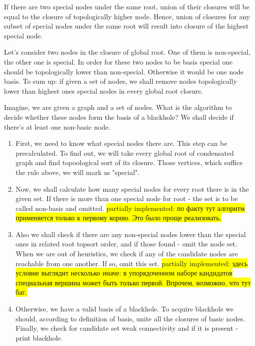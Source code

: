 \documentclass{svproc}
\newcommand{\FIXME}[1]{ %
	\colorbox{yellow}{#1}
}
\newcommand{\FIXME}[1]{ %
}
\begin{document}
If there are two special nodes under the same root, union of their closures will be equal to the closure of topologically higher node.
Hence, union of closures for any subset of special nodes under the same root will result into closure of the highest special node.

Let's consider two nodes in the closure of global root. One of them is non-special, the other one is special. In order for these two nodes to be basis
special one should be topologically lower than non-special. Otherwise it would be one node basis.
To sum up: if given a set of nodes, we shall remove nodes topologically lower than highest ones special nodes in every global root closure.

Imagine, we are given a graph and a set of nodes. What is the algorithm to decide whether these nodes form the basis of a blackhole? We shall decide if there's at least
one non-basic node.
\begin{enumerate}
    \item First, we need to know what special nodes there are. This step can be precalculated. 
    To find out, we will take every global root of condensated graph and find topoological sort of its closure.
    Those vertices, which suffice the rule above, we will mark as "special". 
    \item Now, we shall calculate how many special nodes for every root there is in the given set. If there is more than one special node for root - the set is to be called non-basis and
    omitted. 
    \FIXME{partially implemented: по факту тут алгоритм применяется только к первому корню. Это было проще реализовать. }
    \item Also we shall check if there are any non-special nodes lower than the special ones in related root topsort order, and if those found - omit the node set.
    When we are out of heuristics, we check if any of the candidate nodes are reachable from one another. If so, omit this set.
    \FIXME{partially implemented: здесь условие выглядит несколько иначе: в упорядоченном наборе кандидатов специальная вершина может быть только первой. Впрочем, возможно, что тут баг. }
    \item Otherwise, we have a valid basis of a blackhole.
    To acquire blackhole we should, according to definition of basis, unite all the closures of basic nodes.
    Finally, we check for candidate set weak connectivity and if it is present - print blackhole.
\end{enumerate}
\end{document}
